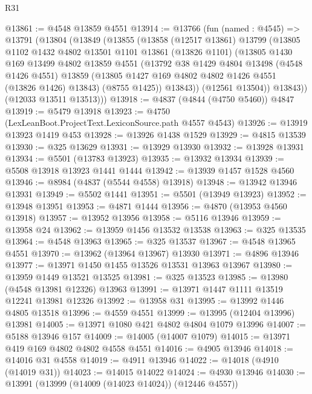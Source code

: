 \begin{lexlean}{R31}
\begin{coremodule}
@13861 := @4548 @13859 @4551
@13914 := @13766
    (fun (named : @4545) =>
    @13791
      (@13804
        (@13849
          (@13855
            (@13858
              (@12517 @13861)
              @13799
              (@13805
                @1102
                @1432
                @4802
                @13501
                @1101
                @13861
                (@13826 @1101)
                (@13805
                  @1430
                  @169
                  @13499
                  @4802
                  @13859
                  @4551
                  (@13792
                    @38
                    @1429
                    @4804
                    @13498
                    (@4548 @1426 @4551)
                    @13859
                    (@13805 @1427 @169 @4802 @4802 @1426 @4551 (@13826 @1426) @13843)
                    (@8755 @1425))
                  @13843))
              (@12561 @13504))
            @13843))
        (@12033 @13511 @13513)))
@13918 := @4837 (@4844 (@4750 @5460)) @4847
@13919 := @5479 @13918
@13923 := @4750 (LexLeanBoot.ProjectText.LexiconSource.path @4557 @4543)
@13926 := @13919 @13923 @1419 @453
@13928 := @13926 @1438 @1529
@13929 := @4815 @13539
@13930 := @325 @13629
@13931 := @13929 @13930
@13932 := @13928 @13931
@13934 := @5501 (@13783 @13923)
@13935 := @13932 @13934
@13939 := @5508 @13918 @13923 @1441 @1444
@13942 := @13939 @1457 @1528 @4560
@13946 := @8984 (@4837 (@5544 @4558) @13918)
@13948 := @13942 @13946 @13931
@13949 := @5502 @1441
@13951 := @5501 (@13949 @13923)
@13952 := @13948 @13951
@13953 := @4871 @1444
@13956 := @4870 (@13953 @4560 @13918)
@13957 := @13952 @13956
@13958 := @5116 @13946
@13959 := @13958 @24
@13962 := @13959 @1456 @13532 @13538
@13963 := @325 @13535
@13964 := @4548 @13963
@13965 := @325 @13537
@13967 := @4548 @13965 @4551
@13970 := @13962 (@13964 @13967) @13930
@13971 := @4896 @13946
@13977 := @13971 @1450 @1455 @13526 @13531 @13963 @13967
@13980 := @13959 @1449 @13521 @13525
@13981 := @325 @13523
@13985 := @13980 (@4548 @13981 @12326) @13963
@13991 := @13971 @1447 @1111 @13519 @12241 @13981 @12326
@13992 := @13958 @31
@13995 := @13992 @1446 @4805 @13518
@13996 := @4559 @4551
@13999 := @13995 (@12404 @13996) @13981
@14005 := @13971 @1080 @421 @4802 @4804 @1079 @13996
@14007 := @5188 @13946 @157
@14009 := @14005 (@14007 @1079)
@14015 := @13971 @419 @169 @4802 @4802 @4558 @4551
@14016 := @4905 @13946
@14018 := @14016 @31 @4558
@14019 := @4911 @13946
@14022 := @14018 (@4910 (@14019 @31))
@14023 := @14015 @14022
@14024 := @4930 @13946
@14030 := @13991 (@13999 (@14009 (@14023 @14024)) (@12446 @4557))

\end{coremodule}
\end{lexlean}
